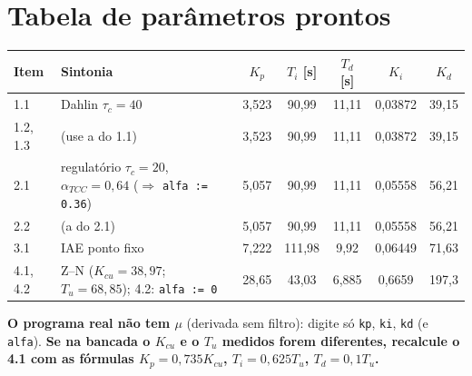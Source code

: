\documentclass[11pt,a4paper]{article}
\begin{document}
\section{Tabela de parâmetros prontos}\label{tabpar}
\begin{center}\small
\begin{tabular}{llccccc}\toprule Item & Sintonia & $K_p$ & $T_i$ [s] & $T_d$ [s] & $K_i$ & $K_d$\\\midrule
1.1 & Dahlin $\tau_c=40$ & 3,523 & 90,99 & 11,11 & 0,03872 & 39,15\\
1.2, 1.3 & (use a do 1.1) & 3,523 & 90,99 & 11,11 & 0,03872 & 39,15\\
2.1 & regulatório $\tau_c=20$, $\alpha_{TCC}=0{,}64$ ($\Rightarrow$ \texttt{alfa := 0.36}) & 5,057 & 90,99 & 11,11 & 0,05558 & 56,21\\
2.2 & (a do 2.1) & 5,057 & 90,99 & 11,11 & 0,05558 & 56,21\\
3.1 & IAE ponto fixo & 7,222 & 111,98 & 9,92 & 0,06449 & 71,63\\
4.1, 4.2 & Z--N ($K_{cu}=38{,}97$; $T_u=68{,}85$); 4.2: \texttt{alfa := 0} & 28,65 & 43,03 & 6,885 & 0,6659 & 197,3\\\bottomrule
\end{tabular}\end{center}
\textbf{O programa real não tem $\mu$} (derivada sem filtro): digite só \texttt{kp}, \texttt{ki}, \texttt{kd} (e \texttt{alfa}). \textbf{Se na bancada o $K_{cu}$ e o $T_u$ medidos forem diferentes, recalcule o 4.1 com as fórmulas $K_p=0{,}735K_{cu}$, $T_i=0{,}625T_u$, $T_d=0{,}1T_u$.}
\end{document}
